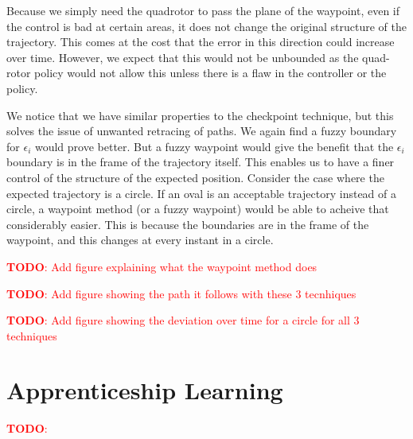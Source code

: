 \documentclass[BTech]{iitmdiss}
\newcommand\todo[1]{\textcolor{red}{{\bf TODO}: #1}}
\begin{document}
Because we simply need the quadrotor to pass the plane of the waypoint, even if the control is bad at certain areas, it does not change the original structure of the trajectory. This comes at the cost that the error in this direction could increase over time. However, we expect that this would not be unbounded as the quad-rotor policy would not allow this unless there is a flaw in the controller or the policy.

We notice that we have similar properties to the checkpoint technique, but this solves the issue of unwanted retracing of paths. We again find a fuzzy boundary for $\epsilon_i$ would prove better. But a fuzzy waypoint would give the benefit that the $\epsilon_i$ boundary is in the frame of the trajectory itself. This enables us to have a finer control of the structure of the expected position. Consider the case where the expected trajectory is a circle. If an oval is an acceptable trajectory instead of a circle, a waypoint method (or a fuzzy waypoint) would be able to acheive that considerably easier. This is because the boundaries are in the frame of the waypoint, and this changes at every instant in a circle.

\todo{Add figure explaining what the waypoint method does}


\todo{Add figure showing the path it follows with these 3 tecnhiques}

\todo{Add figure showing the deviation over time for a circle for all 3 techniques}

\chapter{Apprenticeship Learning}

\todo{}

\begin{singlespace}
  
\end{singlespace}
\end{document}
